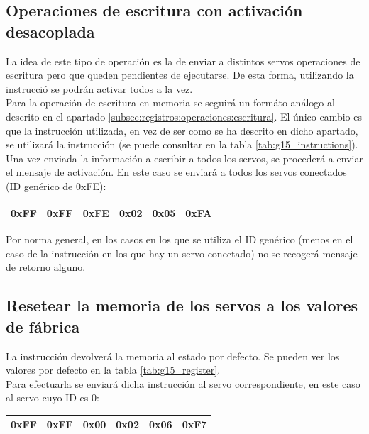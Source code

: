 	\subsection{Operaciones de escritura con activación desacoplada}

		La idea de este tipo de operación es la de enviar a distintos servos operaciones de escritura pero que queden pendientes de ejecutarse. De esta forma, utilizando la instrucció  se podrán activar todos a la vez.
		\\

		Para la operación de escritura en memoria se seguirá un formáto análogo al descrito en el apartado \ref{subsec:registros:operaciones:escritura}. El único cambio es que la instrucción utilizada, en vez de ser  como se ha descrito en dicho apartado, se utilizará la instrucción  (se puede consultar en la tabla \ref{tab:g15_instructions}).
		\\

		Una vez enviada la información a escribir a todos los servos, se procederá a enviar el mensaje de activación. En este caso se enviará a todos los servos conectados (ID genérico de 0xFE):
		\begin{center}
			\begin{tabular}{|c|c|c|c|c|c|}
				\hline
				0xFF & 0xFF & 0xFE & 0x02 & 0x05 & 0xFA \\
				\hline
			\end{tabular}
		\end{center}

		Por norma general, en los casos en los que se utiliza el ID genérico (menos en el caso de la instrucción  en los que hay un servo conectado) no se recogerá mensaje de retorno alguno.

	\subsection{Resetear la memoria de los servos a los valores de fábrica}

		La instrucción  devolverá la memoria al estado por defecto. Se pueden ver los valores por defecto en la tabla \ref{tab:g15_register}.
		\\

		Para efectuarla se enviará dicha instrucción al servo correspondiente, en este caso al servo cuyo ID es 0:
		\begin{center}
			\begin{tabular}{|c|c|c|c|c|c|}
				\hline
				0xFF & 0xFF & 0x00 & 0x02 & 0x06 & 0xF7 \\
				\hline
			\end{tabular}
		\end{center}

